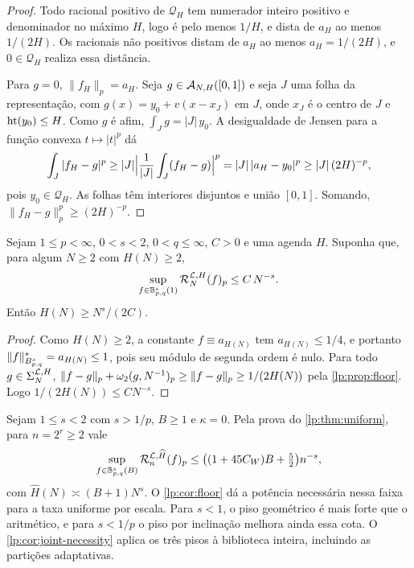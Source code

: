 \documentclass[12pt,a4paper]{article}
\begin{document}
\begin{proof}
Todo racional positivo de $\mathcal Q_H$ tem numerador inteiro positivo e denominador no máximo $H$, logo é pelo menos $1/H$, e dista de $a_H$ ao menos $1/(2H)$. Os racionais não positivos distam de $a_H$ ao menos $a_H=1/(2H)$, e $0\in\mathcal Q_H$ realiza essa distância.

Para $g=0$, $\|f_H\|_p=a_H$. Seja $g\in\mathcal A_{N,H}([0,1])$ e seja $J$ uma folha da representação, com $g(x)=y_0+v(x-x_J)$ em $J$, onde $x_J$ é o centro de $J$ e $\operatorname{ht}(y_0)\le H$. Como $g$ é afim, $\int_Jg=|J|\,y_0$. A desigualdade de Jensen para a função convexa $t\mapsto|t|^p$ dá
\[
 \int_J|f_H-g|^p\ge|J|\Bigl|\frac1{|J|}\int_J(f_H-g)\Bigr|^p=|J|\,|a_H-y_0|^p\ge|J|\,(2H)^{-p},
\]
pois $y_0\in\mathcal Q_H$. As folhas têm interiores disjuntos e união $[0,1]$. Somando, $\|f_H-g\|_p^p\ge(2H)^{-p}$.
\end{proof}

\begin{corolario}
\label{lp:cor:floor}
Sejam $1\le p<\infty$, $0<s<2$, $0<q\le\infty$, $C>0$ e uma agenda $H$. Suponha que, para algum $N\ge2$ com $H(N)\ge2$,
\[
 \sup_{f\in\mathbb B^s_{p,q}(1)}\mathcal R^{\mathcal L,H}_{N}(f)_p\le C\,N^{-s}.
\]
Então $H(N)\ge N^s/(2C)$.
\end{corolario}

\begin{proof}
Como $H(N)\ge2$, a constante $f\equiv a_{H(N)}$ tem $a_{H(N)}\le1/4$, e portanto $\|f\|^*_{B^{s}_{p,q}}=a_{H(N)}\le1$, pois seu módulo de segunda ordem é nulo. Para todo $g\in\Sigma_{N}^{\mathcal L,H}$, $\|f-g\|_p+\omega_2(g,N^{-1})_{p}\ge\|f-g\|_p\ge1/(2H(N))$ pela \cref{lp:prop:floor}. Logo $1/(2H(N))\le CN^{-s}$.
\end{proof}

\begin{observacao}
\label{lp:obs:floor}
Sejam $1\le s<2$ com $s>1/p$, $B\ge1$ e $\kappa=0$. Pela prova do \cref{lp:thm:uniform}, para $n=2^r\ge2$ vale
\[
 \sup_{f\in\mathbb B^s_{p,q}(B)}\mathcal R^{\mathcal L,\widehat H}_{n}(f)_p
 \le\bigl((1+45C_W)B+\tfrac52\bigr)n^{-s},
\]
com $\widehat H(N)\asymp(B+1)N^s$. O \cref{lp:cor:floor} dá a potência necessária nessa faixa para a taxa uniforme por escala. Para $s<1$, o piso geométrico é mais forte que o aritmético, e para $s<1/p$ o piso por inclinação melhora ainda essa cota. O \cref{lp:cor:joint-necessity} aplica os três pisos à biblioteca inteira, incluindo as partições adaptativas.
\end{observacao}
\end{document}
